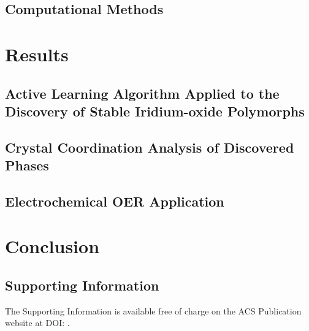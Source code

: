 \subsection{Computational Methods}


\section{Results}


  \subsection{Active Learning Algorithm Applied to the Discovery of Stable Iridium-oxide Polymorphs}
  

  \subsection{Crystal Coordination Analysis of Discovered Phases}
  

  \subsection{Electrochemical OER Application}
  


\section{Conclusion}


\subsection{Supporting Information}
The Supporting Information is available free of charge on the ACS Publication website at DOI: .

